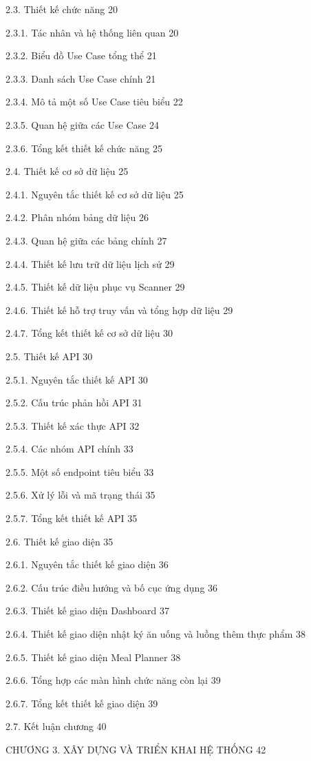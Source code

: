 2.3. Thiết kế chức năng	20

2.3.1. Tác nhân và hệ thống liên quan	20

2.3.2. Biểu đồ Use Case tổng thể	21

2.3.3. Danh sách Use Case chính	21

2.3.4. Mô tả một số Use Case tiêu biểu	22

2.3.5. Quan hệ giữa các Use Case	24

2.3.6. Tổng kết thiết kế chức năng	25

2.4. Thiết kế cơ sở dữ liệu	25

2.4.1. Nguyên tắc thiết kế cơ sở dữ liệu	25

2.4.2. Phân nhóm bảng dữ liệu	26

2.4.3. Quan hệ giữa các bảng chính	27

2.4.4. Thiết kế lưu trữ dữ liệu lịch sử	29

2.4.5. Thiết kế dữ liệu phục vụ Scanner	29

2.4.6. Thiết kế hỗ trợ truy vấn và tổng hợp dữ liệu	29

2.4.7. Tổng kết thiết kế cơ sở dữ liệu	30

2.5. Thiết kế API	30

2.5.1. Nguyên tắc thiết kế API	30

2.5.2. Cấu trúc phản hồi API	31

2.5.3. Thiết kế xác thực API	32

2.5.4. Các nhóm API chính	33

2.5.5. Một số endpoint tiêu biểu	33

2.5.6. Xử lý lỗi và mã trạng thái	35

2.5.7. Tổng kết thiết kế API	35

2.6. Thiết kế giao diện	35

2.6.1. Nguyên tắc thiết kế giao diện	36

2.6.2. Cấu trúc điều hướng và bố cục ứng dụng	36

2.6.3. Thiết kế giao diện Dashboard	37

2.6.4. Thiết kế giao diện nhật ký ăn uống và luồng thêm thực phẩm	38

2.6.5. Thiết kế giao diện Meal Planner	38

2.6.6. Tổng hợp các màn hình chức năng còn lại	39

2.6.7. Tổng kết thiết kế giao diện	39

2.7. Kết luận chương	40

CHƯƠNG 3. XÂY DỰNG VÀ TRIỂN KHAI HỆ THỐNG	42

